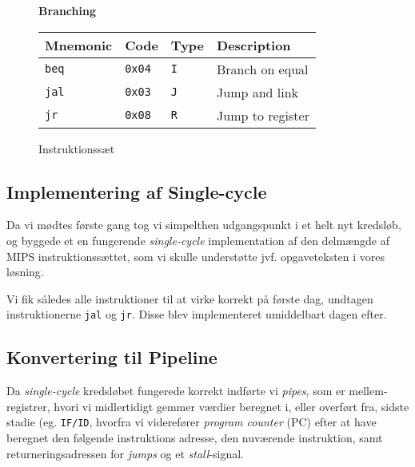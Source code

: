 \documentclass[11pt,twoside,a4paper]{article}
\begin{document}
\begin{figure}[H]
\begin{multicols}{2}
        \vspace{0.26in} %
        \textbf{Branching} \\
        \vspace{0.15in}
        \begin{tabular}{|l|l|l|l|}
                \hline
                \scriptsize {\bf Mnemonic} &
                \scriptsize {\bf Code} &
                \scriptsize {\bf Type} &
                \scriptsize {\bf Description} \\
                \hline {\tt beq} & {\tt 0x04} & {\tt I} &
				\scriptsize Branch on equal \\
                \hline {\tt jal} & {\tt 0x03} & {\tt J} &
				\scriptsize Jump and link \\
                \hline {\tt jr} & {\tt 0x08} & {\tt R} &
				\scriptsize Jump to register \\
                \hline
        \end{tabular}

        \end{multicols}
        \caption{Instruktionssæt}
        \label{fig:instruction-set}
\end{figure}

\subsection{Implementering af Single-cycle}
Da vi mødtes første gang tog vi simpelthen udgangspunkt i et helt nyt
kredsløb, og byggede et en fungerende {\it single-cycle} implementation af
den delmængde af MIPS instruktionssættet, som vi skulle understøtte jvf.
opgaveteksten i vores løsning.

Vi fik således alle instruktioner til at virke korrekt på første dag, undtagen
instruktionerne {\tt jal} og {\tt jr}. Disse blev implementeret umiddelbart
dagen efter.

\subsection{Konvertering til Pipeline}
Da {\it single-cycle} kredsløbet fungerede korrekt indførte vi {\it pipes},
som er mellem-registrer, hvori vi midlertidigt gemmer værdier beregnet i,
eller overført fra, sidste stadie (eg. {\tt IF/ID}, hvorfra vi viderefører
{\it program counter} (PC) efter at have beregnet den følgende instruktions
adresse, den nuværende instruktion, samt returneringsadressen for {\it jumps}
og et {\it stall}-signal.   
\end{document}
